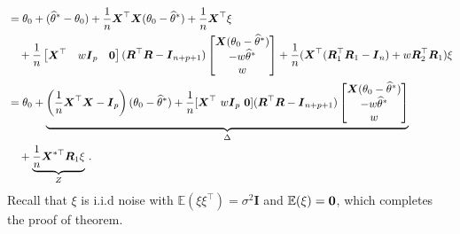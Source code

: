 \documentclass[11pt]{article}
\newcommand{\bX}{\boldsymbol{X}}
\newcommand{\bI}{\boldsymbol{I}}
\newcommand{\bR}{\boldsymbol{R}}
\newcommand{\Expected}{\mathbb{E}}
\newcommand{\hth}{\widehat{\theta}}
\begin{document}
\begin{align}
        &= \theta_0 + (\hth^*-\theta_0) + \frac{1}{n }\bX^\top \bX(\theta_0-\hth^*) +\frac{1}{n }\bX^\top \xi\nonumber\\
        & \quad+\frac{1}{n }\begin{bmatrix}\bX^\top & w\bI_p & \bf{0}\end{bmatrix}(\bR^\top \bR-\bI_{n+p+1})\begin{bmatrix}\bX(\theta_0-\hth^*)\\ -w\hth^*\\ w\end{bmatrix}+\frac{1}{n }(\bX^\top (\bR_1^\top \bR_1-\bI_n)+w\bR_2^\top \bR_1)\xi \nonumber\\
        &= \theta_0 + \underbrace{\left(\frac{1}{n}\bX^\top \bX-\bI_p\right)(\theta_0-\hth^*)
        +\frac{1}{n}[\bX^\top\ w\bI_p\ {\bf 0}](\bR^\top \bR-\bI_{n+p+1})
        \begin{bmatrix}
        \bX(\theta_0-\hth^*)\\ -w\hth^*\\ w
        \end{bmatrix}}_\Delta\nonumber\\
        &\quad+\underbrace{\frac{1}{n }\bX^{*\top}\bR_1\xi}_Z\,.
\end{align}
\normalsize
Recall that $\xi$ is i.i.d noise with $\Expected(\xi\xi^\top)=\sigma^2\bI$ and $\Expected(\xi)=\bf{0}$, which completes the proof of theorem. 
\end{document}
